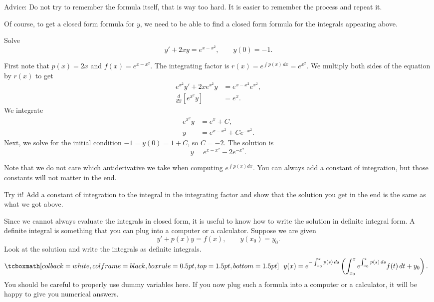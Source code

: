 Advice: Do not try to remember the formula itself, that is way too
hard.  It is easier to remember the process and repeat it.

Of course, to get a closed form formula for $y$,
we need to be able to find a
closed form formula for the integrals appearing above.

\begin{example}
Solve
\begin{equation*}
y' + 2xy = e^{x-x^2}, \qquad y(0) = -1 .
\end{equation*}
\end{example}

\begin{exampleSol}
First note that $p(x) = 2x$ and $f(x) = e^{x-x^2}$.
The integrating factor is $r(x) = e^{\int p(x)\, dx} = e^{x^2}$.
We multiply both sides of the equation by $r(x)$ to get
\begin{align*}
e^{x^2} y' + 2xe^{x^2}y & = e^{x-x^2} e^{x^2} , \\
\frac{d}{dx} \left[ e^{x^2} y \right] &= e^x .
\end{align*}
We integrate
\begin{align*}
e^{x^2} y &= e^x +C , \\
y &= e^{x-x^2} + C e^{-x^2} .
\end{align*}
Next, we solve for the initial condition $-1 = y(0) = 1 + C$, so $C=-2$.
The solution is
\begin{equation*}
y = e^{x-x^2} - 2 e^{-x^2} .
\end{equation*}
\end{exampleSol}

Note that we do not care which antiderivative we take when computing
$e^{\int p(x) dx}$.  You can always add a constant of integration,
but those constants
will not matter in the end.

\begin{exercise}
Try it!  Add a constant of integration to the integral in
the integrating factor and show that the solution you get in the end is the
same as what we got above.
\end{exercise}

Since we cannot always evaluate the integrals in closed form, it is useful to
know how to write the solution in definite integral form.  A definite
integral is something that
you can plug into a computer or a calculator.  Suppose we are given
\begin{equation*}
y' + p(x) y = f(x) , \qquad y(x_0) = y_0 .
\end{equation*}
Look at the solution and write the integrals
as definite integrals.
\begin{equation} \label{lei:defsol}
\mybxbg{
~~
y(x) = e^{-\int_{x_0}^x p(s)\, ds} \left( \int_{x_0}^x e^{\int_{x_0}^t p(s)\, ds}
f(t) \,dt + y_0 \right).
~~
}
\end{equation}
You should
be careful to properly use dummy variables here.  If you now plug such a
formula into a
computer or a calculator, it will be happy to give you numerical answers.

